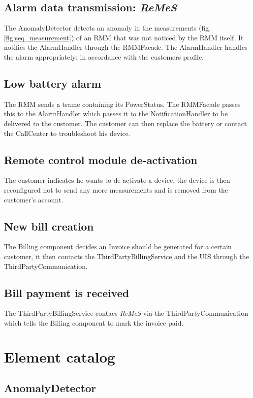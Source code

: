 \documentclass[a4paper,10pt]{article}
\newcommand{\rem}{\emph{ReMeS}\xspace}
\begin{document}
\subsection{Alarm data transmission: \rem}
The AnomalyDetector detects an anomaly in the measurements (fig. \ref{fig:seq_measurement}) of an RMM that was not noticed by the RMM itself. It notifies the AlarmHandler through the RMMFacade. The AlarmHandler handles the alarm appropriately: in accordance with the customers profile.

\subsection{Low battery alarm}
The RMM sends a trame containing its PowerStatus. The RMMFacade passes this to the AlarmHandler which passes it to the NotificationHandler to be delivered to the customer. The customer can then replace the battery or contact the CallCenter to troubleshoot his device.

\subsection{Remote control module de-activation}
The customer indicates he wants to de-activate a device, the device is then reconfigured not to send any more measurements and is removed from the customer's account.

\subsection{New bill creation}
The Billing component decides an Invoice should be generated for a certain customer, it then contacts the ThirdPartyBillingService and the UIS through the ThirdPartyCommunication.

\subsection{Bill payment is received}
The ThirdPartyBillingService contacs \rem via the ThirdPartyCommunication which tells the Billing component to mark the invoice paid.

\appendix
\section{Element catalog}\label{app:catalog}

\subsection{AnomalyDetector}
\end{document}

